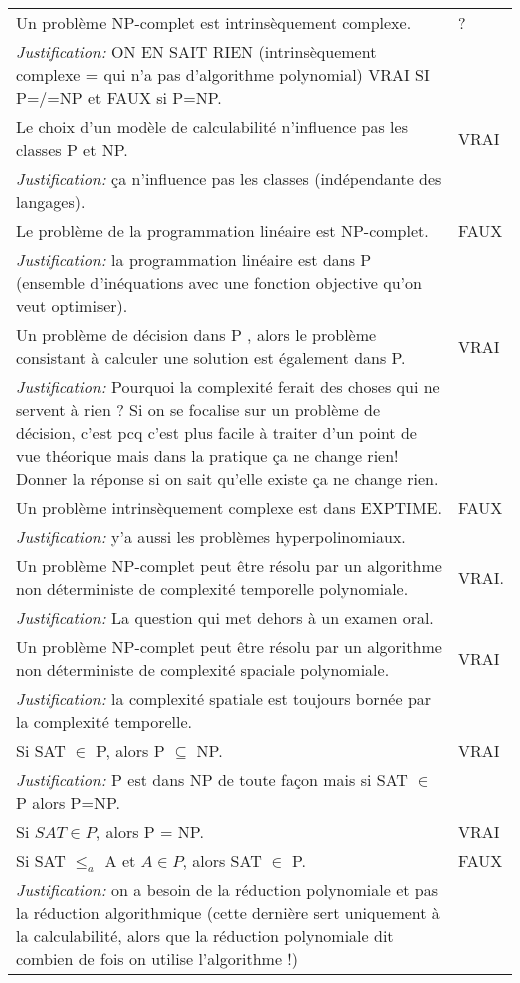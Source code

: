 \begin{longtable}{p{13cm}|l}
     Un problème NP-complet est intrinsèquement complexe. & ? \\
    \textit{Justification:} ON EN SAIT RIEN (intrinsèquement complexe = qui n'a pas d'algorithme polynomial) VRAI SI P=/=NP et FAUX si P=NP. & \\
    \hline
    Le choix d’un modèle de calculabilité n’influence pas les classes P et NP. & VRAI \\
    \textit{Justification:} ça n'influence pas les classes (indépendante des langages). & \\
    \hline
    Le problème de la programmation linéaire est NP-complet. & FAUX \\
    \textit{Justification:} la programmation linéaire est dans P (ensemble d'inéquations avec une fonction objective qu'on veut optimiser). & \\
    \hline
    Un problème de décision dans P , alors le problème consistant à calculer une solution est également dans P. & VRAI \\
    \textit{Justification:} Pourquoi la complexité ferait des choses qui ne servent à rien ? Si on se focalise sur un problème de décision, c'est pcq c'est plus facile à traiter d'un point de vue théorique mais dans la pratique ça ne change rien! Donner la réponse si on sait qu'elle existe ça ne change rien. & \\
    \hline
    Un problème intrinsèquement complexe est dans EXPTIME.  & FAUX \\
    \textit{Justification:} y'a aussi les problèmes hyperpolinomiaux.& \\
    \hline
    Un problème NP-complet peut être résolu par un algorithme non déterministe de complexité temporelle polynomiale. & VRAI. \\
    \textit{Justification:} La question qui met dehors à un examen oral. & \\
    \hline
    Un problème NP-complet peut être résolu par un algorithme non déterministe de complexité spaciale polynomiale. & VRAI \\
    \textit{Justification:}  la complexité spatiale est toujours bornée par la complexité temporelle. & \\
    \hline
    Si SAT $\in$ P, alors P $\subseteq$ NP.& VRAI \\
    \textit{Justification:} P est dans NP de toute façon mais si SAT $\in$ P alors P=NP. & \\
    \hline
    Si $SAT \in P$, alors P = NP. & VRAI \\
    \hline
    Si SAT $\leq_{a}$ A et $A \in P$, alors SAT $\in$ P.& FAUX \\
    \textit{Justification:} on a besoin de la réduction polynomiale et pas la réduction algorithmique (cette dernière sert uniquement à la calculabilité, alors que la réduction polynomiale dit combien de fois on utilise l'algorithme !) & \\
    \hline

\end{longtable}
